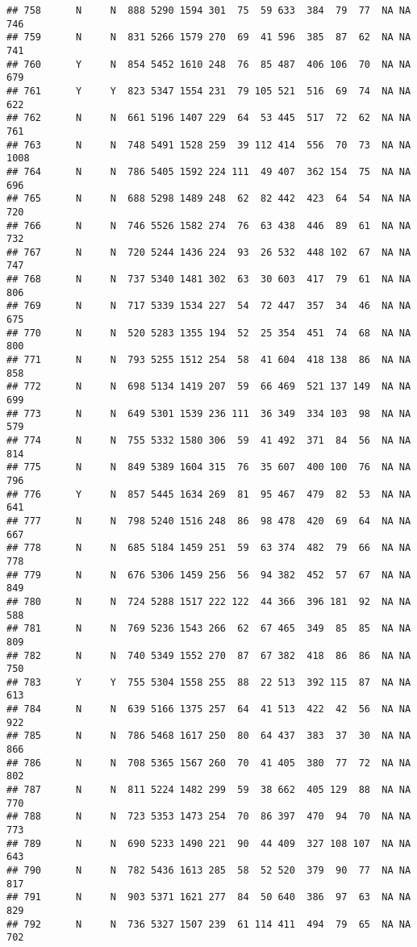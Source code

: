 \documentclass[]{article}
\begin{document}
\begin{verbatim}
## 758      N     N  888 5290 1594 301  75  59 633  384  79  77  NA NA  746
## 759      N     N  831 5266 1579 270  69  41 596  385  87  62  NA NA  741
## 760      Y     N  854 5452 1610 248  76  85 487  406 106  70  NA NA  679
## 761      Y     Y  823 5347 1554 231  79 105 521  516  69  74  NA NA  622
## 762      N     N  661 5196 1407 229  64  53 445  517  72  62  NA NA  761
## 763      N     N  748 5491 1528 259  39 112 414  556  70  73  NA NA 1008
## 764      N     N  786 5405 1592 224 111  49 407  362 154  75  NA NA  696
## 765      N     N  688 5298 1489 248  62  82 442  423  64  54  NA NA  720
## 766      N     N  746 5526 1582 274  76  63 438  446  89  61  NA NA  732
## 767      N     N  720 5244 1436 224  93  26 532  448 102  67  NA NA  747
## 768      N     N  737 5340 1481 302  63  30 603  417  79  61  NA NA  806
## 769      N     N  717 5339 1534 227  54  72 447  357  34  46  NA NA  675
## 770      N     N  520 5283 1355 194  52  25 354  451  74  68  NA NA  800
## 771      N     N  793 5255 1512 254  58  41 604  418 138  86  NA NA  858
## 772      N     N  698 5134 1419 207  59  66 469  521 137 149  NA NA  699
## 773      N     N  649 5301 1539 236 111  36 349  334 103  98  NA NA  579
## 774      N     N  755 5332 1580 306  59  41 492  371  84  56  NA NA  814
## 775      N     N  849 5389 1604 315  76  35 607  400 100  76  NA NA  796
## 776      Y     N  857 5445 1634 269  81  95 467  479  82  53  NA NA  641
## 777      N     N  798 5240 1516 248  86  98 478  420  69  64  NA NA  667
## 778      N     N  685 5184 1459 251  59  63 374  482  79  66  NA NA  778
## 779      N     N  676 5306 1459 256  56  94 382  452  57  67  NA NA  849
## 780      N     N  724 5288 1517 222 122  44 366  396 181  92  NA NA  588
## 781      N     N  769 5236 1543 266  62  67 465  349  85  85  NA NA  809
## 782      N     N  740 5349 1552 270  87  67 382  418  86  86  NA NA  750
## 783      Y     Y  755 5304 1558 255  88  22 513  392 115  87  NA NA  613
## 784      N     N  639 5166 1375 257  64  41 513  422  42  56  NA NA  922
## 785      N     N  786 5468 1617 250  80  64 437  383  37  30  NA NA  866
## 786      N     N  708 5365 1567 260  70  41 405  380  77  72  NA NA  802
## 787      N     N  811 5224 1482 299  59  38 662  405 129  88  NA NA  770
## 788      N     N  723 5353 1473 254  70  86 397  470  94  70  NA NA  773
## 789      N     N  690 5233 1490 221  90  44 409  327 108 107  NA NA  643
## 790      N     N  782 5436 1613 285  58  52 520  379  90  77  NA NA  817
## 791      N     N  903 5371 1621 277  84  50 640  386  97  63  NA NA  829
## 792      N     N  736 5327 1507 239  61 114 411  494  79  65  NA NA  702

\end{verbatim}
\end{document}
